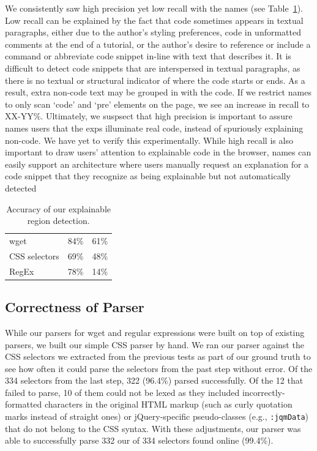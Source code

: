 \begin{changes}
We consistently saw high precision yet low recall with the \glspl{name} (see Table~\ref{tab:detection_accuracy}).    
Low recall can be explained by the fact that code sometimes appears in textual paragraphs, either due to the author's styling preferences, code in unformatted comments at the end of a tutorial, or the author's desire to reference or include a command or abbreviate code snippet in-line with text that describes it.
It is difficult to detect code snippets that are interspersed in textual paragraphs, as there is no textual or structural indicator of where the code starts or ends.
As a result, extra non-code text may be grouped in with the code.
If we restrict \glspl{name} to only scan `code' and `pre' elements on the page, we see an increase in recall to XX-YY\%.
Ultimately, we suspsect that high precision is important to assure \glspl{name} users that the \glspl{exp} illuminate real code, instead of spuriously explaining non-code.
We have yet to verify this experimentally.
While high recall is also important to draw users' attention to explainable code in the browser, \glspl{name} can easily support an architecture where users manually request an explanation for a code snippet that they recognize as being explainable but not automatically detected

\begin{table}
\caption{Accuracy of our explainable region detection.}
\label{tab:detection_accuracy}
\centering
\begin{tabular}{llc}
\toprule
\headrow{Language} & \headrow{Precision} & \headrow{Recall} \\
\midrule
wget & 84\% & 61\% \\ \midrule
CSS selectors & 69\% & 48\% \\ \midrule
RegEx & 78\% & 14\% \\ \bottomrule
\end{tabular}
\end{table}

\subsection{Correctness of Parser}

While our parsers for wget and regular expressions were built on top of existing parsers, we built our simple CSS parser by hand.
We ran our parser against the CSS selectors we extracted from the previous tests as part of our ground truth to see how often it could parse the selectors from the past step without error.
Of the 334 selectors from the last step, 322 (96.4\%) parsed successfully.
Of the 12 that failed to parse, 10 of them could not be lexed as they included incorrectly-formatted characters in the original HTML markup (such as curly quotation marks instead of straight ones) or jQuery-specific pseudo-classes (e.g., \texttt{:jqmData}) that do not belong to the CSS syntax.
With these adjustments, our parser was able to successfully parse 332 our of 334 selectors found online (99.4\%).

\end{changes}

